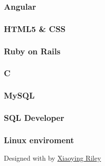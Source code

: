 \documentclass[english,]{article}
\begin{document}
\hypertarget{angular}{%
\subsubsection{Angular}\label{angular}}

\hypertarget{html5-css}{%
\subsubsection{HTML5 \& CSS}\label{html5-css}}

\hypertarget{ruby-on-rails}{%
\subsubsection{Ruby on Rails}\label{ruby-on-rails}}

\hypertarget{c}{%
\subsubsection{C}\label{c}}

\hypertarget{mysql}{%
\subsubsection{MySQL}\label{mysql}}

\hypertarget{sql-developer}{%
\subsubsection{SQL Developer}\label{sql-developer}}

\hypertarget{linux-enviroment}{%
\subsubsection{Linux enviroment}\label{linux-enviroment}}

{Designed with \emph{} by \href{http://themes.3rdwavemedia.com}{Xiaoying
Riley}}
\end{document}
